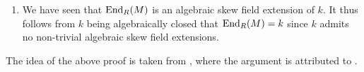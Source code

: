 \begin{remark}
\begin{enumerate}[label=\arabic*)]
    \item
      We have seen that $\operatorname{End}_R(M)$ is an algebraic skew field extension of $k$.
      It thus follows from $k$ being algebraically closed that $\operatorname{End}_R(M) = k$ since $k$ admits no non-trivial algebraic skew field extensions.
  \end{enumerate}
  The idea of the above proof is taken from \cite{Quillen}, where the argument is attributed to \cite{Dixmier}.
\end{remark}




